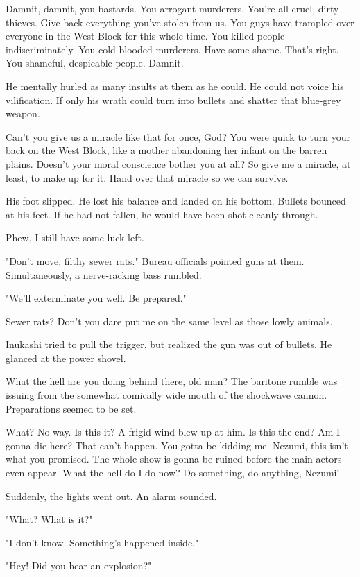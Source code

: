 Damnit, damnit, you bastards. You arrogant murderers. You're all cruel,
dirty thieves. Give back everything you've stolen from us. You guys have
trampled over everyone in the West Block for this whole time. You killed
people indiscriminately. You cold-blooded murderers. Have some shame.
That's right. You shameful, despicable people. Damnit.

He mentally hurled as many insults at them as he could. He could not
voice his vilification. If only his wrath could turn into bullets and
shatter that blue-grey weapon.

Can't you give us a miracle like that for once, God? You were quick to
turn your back on the West Block, like a mother abandoning her infant on
the barren plains. Doesn't your moral conscience bother you at all? So
give me a miracle, at least, to make up for it. Hand over that miracle
so we can survive.

His foot slipped. He lost his balance and landed on his bottom. Bullets
bounced at his feet. If he had not fallen, he would have been shot
cleanly through.

Phew, I still have some luck left.

"Don't move, filthy sewer rats." Bureau officials pointed guns at them.
Simultaneously, a nerve-racking bass rumbled.

"We'll exterminate you well. Be prepared."

Sewer rats? Don't you dare put me on the same level as those lowly
animals.

Inukashi tried to pull the trigger, but realized the gun was out of
bullets. He glanced at the power shovel.

What the hell are you doing behind there, old man? The baritone rumble
was issuing from the somewhat comically wide mouth of the shockwave
cannon. Preparations seemed to be set.

What? No way. Is this it? A frigid wind blew up at him. Is this the end?
Am I gonna die here? That can't happen. You gotta be kidding me. Nezumi,
this isn't what you promised. The whole show is gonna be ruined before
the main actors even appear. What the hell do I do now? Do something, do
anything, Nezumi!

Suddenly, the lights went out. An alarm sounded.

"What? What is it?"

"I don't know. Something's happened inside."

"Hey! Did you hear an explosion?"

